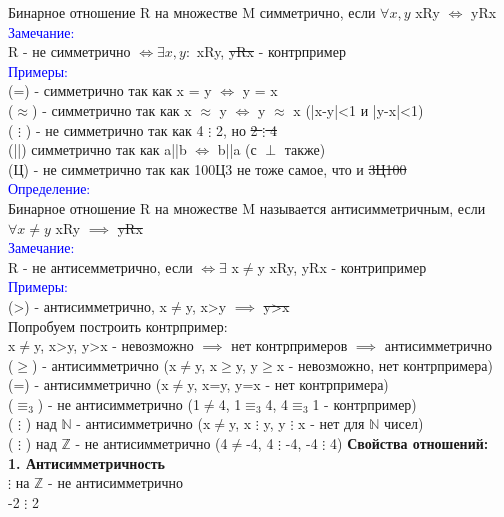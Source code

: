 \documentclass[a4paper,12pt]{article}   %
\begin{document}
Бинарное отношение R на множестве M симметрично, если $\forall x,y$ xRy $\iff$ yRx \\
\textcolor{blue}{Замечание:} \\
R - не симметрично $\iff \exists x,y:$ xRy, \sout{yRx} - контрпример \\
\textcolor{blue}{Примеры:} \\
(=) - симметрично так как x = y $\iff$ y = x \\
($\approx$) - симметрично так как x $\approx$ y $\iff$ y $\approx$ x (|x-y|<1 и |y-x|<1) \\
( $\vdots$ ) - не симметрично так как 4 $\vdots$ 2, но \sout{2 $\vdots$ 4} \\
(||) симметрично так как a||b $\iff$ b||a (с $\perp$ также) \\
(Ц) - не симметрично так как 100Ц3 не тоже самое, что и \sout{3Ц100} \\
\textcolor{blue}{Определение:} \\
Бинарное отношение R на множестве M называется антисимметричным, если $\forall x \neq y$ xRy $\implies$ \sout{yRx} \\
\textcolor{blue}{Замечание:} \\
R - не антисемметрично, если $\iff \exists$ x$\neq$y xRy, yRx - контрипример \\
\textcolor{blue}{Примеры:} \\
(>) - антисимметрично, x$\neq$y, x>y $\implies$ \sout{y>x} \\
Попробуем построить контрпример: \\
x$\neq$y, x>y, y>x - невозможно $\implies$ нет контрпримеров $\implies$ антисимметрично \\
($\geq$) - антисимметрично (x$\neq$y, x$\geq$y, y$\geq$x - невозможно, нет контрпримера) \\
(=) - антисимметрично (x$\neq$y, x=y, y=x - нет контрпримера) \\
($\equiv_3$) - не антисимметрично (1$\neq$4, 1$\equiv_3$4, 4$\equiv_3$1 - контрпример) \\
( $\vdots$ ) над $\mathbb{N}$ - антисимметрично (x$\neq$y, x $\vdots$ y, y $\vdots$ x - нет для $\mathbb{N}$ чисел) \\
( $\vdots$ ) над $\mathbb{Z}$ - не антисимметрично (4$\neq$-4, 4 $\vdots$ -4, -4 $\vdots$ 4) 
\textbf{Свойства отношений:} \\
\textbf{1. Антисимметричность} \\
$\vdots$ на $\mathbb{Z}$ - не антисимметрично \\
-2 $\vdots$ 2 \\
\end{document}
